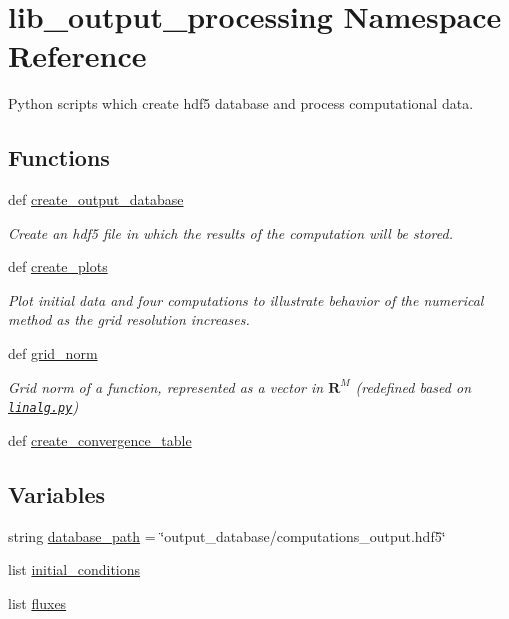 \hypertarget{namespacelib__output__processing}{\section{lib\-\_\-output\-\_\-processing Namespace Reference}
\label{namespacelib__output__processing}
}


Python scripts which create hdf5 database and process computational data.  


\subsection*{Functions}
\begin{DoxyCompactItemize}
\item 
def \hyperlink{namespacelib__output__processing_a9d14f327be0f18a0142e5b76ec5f4aef}{create\-\_\-output\-\_\-database}
\begin{DoxyCompactList}\small\item\em Create an hdf5 file in which the results of the computation will be stored. \end{DoxyCompactList}\item 
def \hyperlink{namespacelib__output__processing_a61052700da63608865a253a3a6e6a456}{create\-\_\-plots}
\begin{DoxyCompactList}\small\item\em Plot initial data and four computations to illustrate behavior of the numerical method as the grid resolution increases. \end{DoxyCompactList}\item 
def \hyperlink{namespacelib__output__processing_a7a26528b8944dc845d0edc4b95902830}{grid\-\_\-norm}
\begin{DoxyCompactList}\small\item\em Grid norm of a function, represented as a vector in $ \mathbf{R}^M $ (redefined based on \href{https://github.com/numpy/numpy/blob/v1.9.1/numpy/linalg/linalg.py#L1924}{\tt linalg.\-py}) \end{DoxyCompactList}\item 
def \hyperlink{namespacelib__output__processing_a99a6cd2aadc4ee45a7995ffab5d7ebdf}{create\-\_\-convergence\-\_\-table}
\end{DoxyCompactItemize}
\subsection*{Variables}
\begin{DoxyCompactItemize}
\item 
string \hyperlink{namespacelib__output__processing_ad1f7a4c194d8a2ab802e2d5aec50df5c}{database\-\_\-path} = \char`\"{}output\-\_\-database/computations\-\_\-output.\-hdf5\char`\"{}
\item 
list \hyperlink{namespacelib__output__processing_a88659a6c20fb70cd273430b1029d7e2d}{initial\-\_\-conditions}
\item 
list \hyperlink{namespacelib__output__processing_aa8835dfb3aa4d41cd54f9eba11f9fcee}{fluxes}
\end{DoxyCompactItemize}


